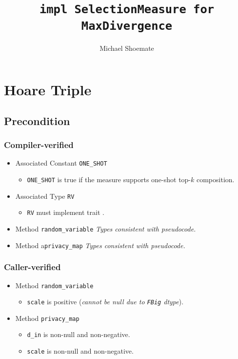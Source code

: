 \documentclass{article}
\title{\texttt{impl SelectionMeasure for MaxDivergence}}
\author{Michael Shoemate}
\begin{document}
  
\maketitle 
 
\section{Hoare Triple} 
\subsection*{Precondition} 
\subsubsection*{Compiler-verified}
\begin{itemize}
    \item Associated Constant \texttt{ONE\_SHOT}
        \begin{itemize}
            \item \texttt{ONE\_SHOT} is true if the measure supports one-shot top-$k$ composition.
        \end{itemize}
    \item Associated Type \texttt{RV}
        \begin{itemize}
            \item \texttt{RV} must implement trait .
        \end{itemize}
    \item Method \texttt{random\_variable}
        \textit{Types consistent with pseudocode.}
    \item Method a\texttt{privacy\_map}
        \textit{Types consistent with pseudocode.}
\end{itemize}

\subsubsection*{Caller-verified}
\begin{itemize}
    \item Method \texttt{random\_variable}
        \begin{itemize}
            \item \texttt{scale} is positive (\textit{cannot be null due to \texttt{FBig} dtype}).
        \end{itemize}
    \item Method \texttt{privacy\_map}
        \begin{itemize}
            \item \texttt{d\_in} is non-null and non-negative.
            \item \texttt{scale} is non-null and non-negative.
        \end{itemize}
\end{itemize}
\end{document}
